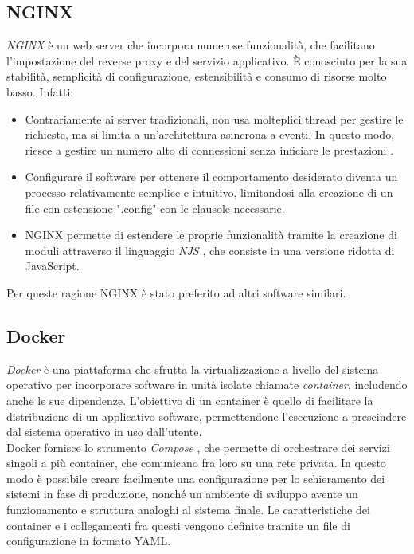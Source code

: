 \subsection{NGINX}
\textit{NGINX} \cite{nginx_bib} è un web server che incorpora numerose funzionalità, che facilitano l'impostazione del reverse proxy e del servizio applicativo. 
È conosciuto per la sua stabilità, semplicità di configurazione, estensibilità e consumo di risorse molto basso. Infatti:
\begin{itemize}
    \item 
    Contrariamente ai server tradizionali,  
    non usa molteplici thread per gestire le richieste, ma si limita a un'architettura asincrona a eventi. 
    In questo modo, riesce a gestire un numero alto di connessioni senza inficiare le prestazioni \cite{nginx_doc}. 
    
    \item Configurare il software per ottenere il comportamento desiderato diventa un processo relativamente semplice e intuitivo, limitandosi
    alla creazione di un file con estensione ".config" con le clausole necessarie. 
    \item NGINX permette di estendere le proprie funzionalità tramite la creazione di moduli attraverso il linguaggio \textit{NJS} \cite{njs_doc}, 
    che consiste in una versione ridotta di JavaScript. 
\end{itemize}
Per queste ragione NGINX è stato preferito ad altri software similari.

\subsection{Docker}
\textit{Docker} \cite{docker_doc} è una piattaforma che sfrutta la virtualizzazione a livello del sistema operativo per incorporare software 
in unità isolate chiamate \textit{container}, includendo anche le sue dipendenze. L'obiettivo di un container è quello di 
facilitare la distribuzione di un applicativo software, permettendone l'esecuzione a prescindere dal sistema operativo 
in uso dall'utente. 
\\ Docker fornisce lo strumento \textit{Compose} \cite{docker_comp}, che permette di orchestrare dei servizi singoli a più container, 
che comunicano fra loro su una rete privata. In questo modo è possibile creare facilmente una configurazione per lo schieramento dei sistemi in fase di produzione, 
nonché un ambiente di sviluppo avente 
un funzionamento e struttura analoghi al sistema finale. Le caratteristiche dei container e i collegamenti fra questi
 vengono definite tramite un file di configurazione in formato YAML. 


